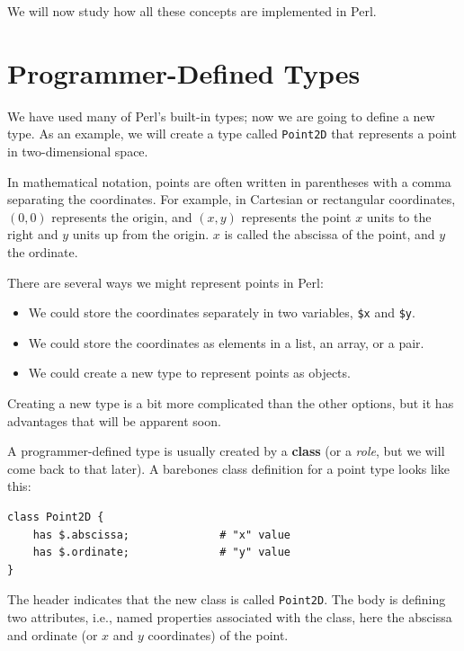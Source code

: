 We will now study how all these concepts are implemented in Perl.


\section{Programmer-Defined Types}
\label{point}

We have used many of Perl's built-in types; now we are going
to define a new type.  As an example, we will create a type
called {\tt Point2D} that represents a point in 
two-dimensional space.

In mathematical notation, points are often written in
parentheses with a comma separating the coordinates. For example,
in Cartesian or rectangular coordinates, $(0,0)$ represents 
the origin, and $(x,y)$ represents the point $x$ units to the 
right and $y$ units up from the origin. $x$ is called 
the abscissa of the point, and $y$ the ordinate.

There are several ways we might represent points in Perl:

\begin{itemize}

\item We could store the coordinates separately in two
variables, {\tt \$x} and {\tt \$y}.

\item We could store the coordinates as elements in a list, 
an array, or a pair.

\item We could create a new type to represent points as
objects.

\end{itemize}

Creating a new type is a bit more complicated than the 
other options, but it has advantages that will be apparent soon.

A programmer-defined type is usually created by a {\bf class}
(or a \emph{role}, but we will come back to that later). 
A barebones class definition for a point type looks like this:

\begin{verbatim}
class Point2D {
    has $.abscissa;              # "x" value
    has $.ordinate;              # "y" value
}
\end{verbatim}
%
The header indicates that the new class is called {\tt Point2D}.
The body is defining two attributes, i.e., named properties 
associated with the class, here the abscissa and ordinate 
(or $x$ and $y$ coordinates) of the point.

